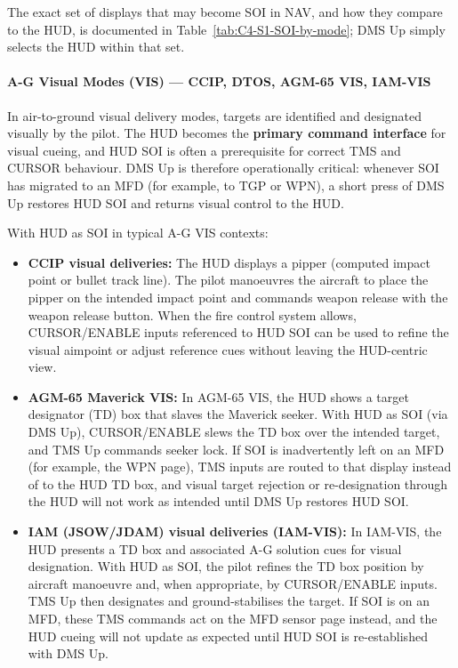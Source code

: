\documentclass[11pt, a4paper, twoside]{report}
\begin{document}
The exact set of displays that may become SOI in NAV, and how they compare to the HUD, is documented in Table~\ref{tab:C4-S1-SOI-by-mode}; DMS Up simply selects the HUD within that set.

\paragraph*{A-G Visual Modes (VIS) --- CCIP, DTOS, AGM-65 VIS, IAM-VIS}
In air-to-ground visual delivery modes, targets are identified and designated visually by the pilot. The HUD becomes the \textbf{primary command interface} for visual cueing, and HUD SOI is often a prerequisite for correct TMS and CURSOR behaviour. DMS Up is therefore operationally critical: whenever SOI has migrated to an MFD (for example, to TGP or WPN), a short press of DMS Up restores HUD SOI and returns visual control to the HUD.

With HUD as SOI in typical A-G VIS contexts:

\begin{itemize}
  \item \textbf{CCIP visual deliveries:} The HUD displays a pipper (computed impact point or bullet track line). The pilot manoeuvres the aircraft to place the pipper on the intended impact point and commands weapon release with the weapon release button. When the fire control system allows, CURSOR/ENABLE inputs referenced to HUD SOI can be used to refine the visual aimpoint or adjust reference cues without leaving the HUD-centric view.
  \item \textbf{AGM-65 Maverick VIS:} In AGM-65 VIS, the HUD shows a target designator (TD) box that slaves the Maverick seeker. With HUD as SOI (via DMS Up), CURSOR/ENABLE slews the TD box over the intended target, and TMS Up commands seeker lock. If SOI is inadvertently left on an MFD (for example, the WPN page), TMS inputs are routed to that display instead of to the HUD TD box, and visual target rejection or re-designation through the HUD will not work as intended until DMS Up restores HUD SOI.
  \item \textbf{IAM (JSOW/JDAM) visual deliveries (IAM-VIS):} In IAM-VIS, the HUD presents a TD box and associated A-G solution cues for visual designation. With HUD as SOI, the pilot refines the TD box position by aircraft manoeuvre and, when appropriate, by CURSOR/ENABLE inputs. TMS Up then designates and ground-stabilises the target. If SOI is on an MFD, these TMS commands act on the MFD sensor page instead, and the HUD cueing will not update as expected until HUD SOI is re-established with DMS Up.
\end{itemize}
\end{document}
